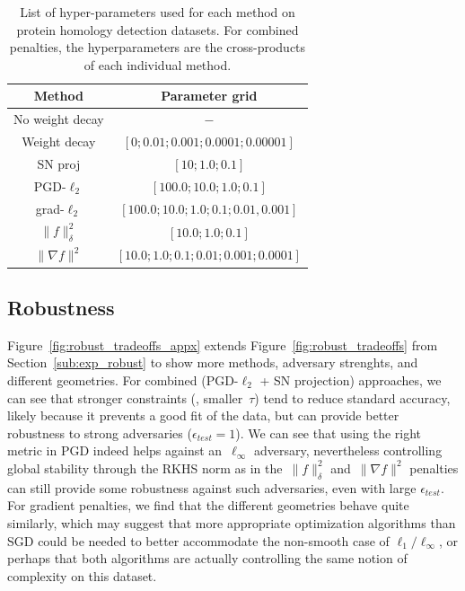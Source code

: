 \begin{table}
\caption{List of hyper-parameters used for each method on protein homology detection datasets.
For combined penalties, the hyperparameters are the cross-products of each individual method.}
\centering
\small
\vspace{0.2cm}
\label{tab:protein_param_grid}
\begin{tabular}{|c|c|}
\hline
 Method                                                       &   Parameter grid \\ \hline
\hline
 No weight decay  &  $-$                          \\
 Weight decay     &  $[0; 0.01; 0.001; 0.0001; 0.00001]$ \\
 SN proj          &  $[10; 1.0; 0.1]$             \\
 PGD-$\ell_2$     &  $[100.0; 10.0; 1.0; 0.1]$    \\
 grad-$\ell_2$    &  $[100.0; 10.0; 1.0; 0.1; 0.01, 0.001]$     \\
 $\|f\|_{\delta}^2$      &  $[10.0; 1.0; 0.1]$           \\
 $\|\nabla f\|^2$ &  $[10.0; 1.0; 0.1; 0.01; 0.001; 0.0001]$ \\
\hline
\end{tabular}
\end{table}


\subsection{Robustness}
\label{sub:robustness_appx}

Figure~\ref{fig:robust_tradeoffs_appx} extends Figure~\ref{fig:robust_tradeoffs}
from Section~\ref{sub:exp_robust} to show more methods, adversary strenghts, and different geometries.
For combined (PGD-$\ell_2$ + SN projection) approaches, we can see that stronger constraints (\ie, smaller~$\tau$)
tend to reduce standard accuracy, likely because it prevents a good fit of the data,
but can provide better robustness to strong adversaries ($\epsilon_{test} = 1$).
We can see that using the right metric in PGD indeed helps against an~$\ell_\infty$ adversary,
nevertheless controlling global stability through the RKHS norm as in the~$\|f\|_\delta^2$ and~$\|\nabla f\|^2$
penalties can still provide some robustness against such adversaries, even with large $\epsilon_{test}$.
For gradient penalties, we find that the different geometries behave quite similarly,
which may suggest that more appropriate optimization algorithms than SGD could be needed to
better accommodate the non-smooth case of $\ell_1/\ell_\infty$, or perhaps that both algorithms are actually
controlling the same notion of complexity on this dataset.


